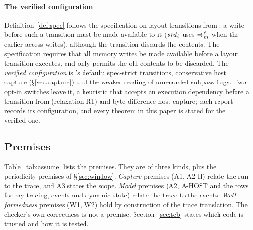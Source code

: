 \paragraph{The verified configuration}
Definition~\ref{def:spec} follows the specification on layout transitions from : a write before such a
transition must be made available to it ($\mathit{ord}_{\ell}$ uses $\Rightarrow_{m}^{\ell}$ when the earlier access writes), although the
transition discards the contents. The specification requires that all memory writes be made available before a
layout transition executes, and  only permits the old contents to be discarded. The \emph{verified
configuration} is \sys's default: spec-strict transitions, conservative host capture (\S\ref{sec:capture}) and the
weaker reading of unrecorded subpass flags. Two opt-in switches leave it, a heuristic that accepts an execution
dependency before a transition from  (relaxation R1) and byte-difference host capture; each report
records its configuration, and every theorem in this paper is stated for the verified one.

\subsection{Premises}
\label{sec:premises}

Table~\ref{tab:assume} lists the premises. They are of three kinds, plus the periodicity premises of
\S\ref{sec:window}. \emph{Capture} premises (A1, A2-H) relate the run
to the trace, and A3 states the scope. \emph{Model} premises (A2, A-HOST and the rows for ray tracing, events and
dynamic state) relate the trace to the events. \emph{Well-formedness} premises (W1, W2) hold by construction of the
trace translation. The checker's own correctness is not a premise. Section~\ref{sec:tcb} states which code is trusted and how it is
tested.

